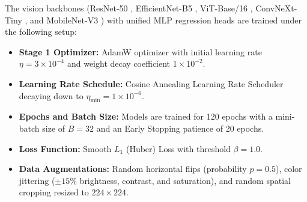 \documentclass[journal,twocolumn]{IEEEtran}
\begin{document}
The vision backbones (ResNet-50 \cite{resnet}, EfficientNet-B5 \cite{efficientnet}, ViT-Base/16 \cite{vit}, ConvNeXt-Tiny \cite{convnext}, and MobileNet-V3 \cite{mobilenet}) with unified MLP regression heads are trained under the following setup:
\begin{itemize}
    \item \textbf{Stage 1 Optimizer:} AdamW optimizer with initial learning rate $\eta = 3 \times 10^{-4}$ and weight decay coefficient $1 \times 10^{-2}$.
    \item \textbf{Learning Rate Schedule:} Cosine Annealing Learning Rate Scheduler decaying down to $\eta_{\min} = 1 \times 10^{-6}$.
    \item \textbf{Epochs and Batch Size:} Models are trained for 120 epochs with a mini-batch size of $B = 32$ and an Early Stopping patience of 20 epochs.
    \item \textbf{Loss Function:} Smooth $L_1$ (Huber) Loss \cite{huber} with threshold $\beta = 1.0$.
    \item \textbf{Data Augmentations:} Random horizontal flips (probability $p=0.5$), color jittering ($\pm 15\%$ brightness, contrast, and saturation), and random spatial cropping resized to $224 \times 224$.
\end{itemize}
\end{document}
